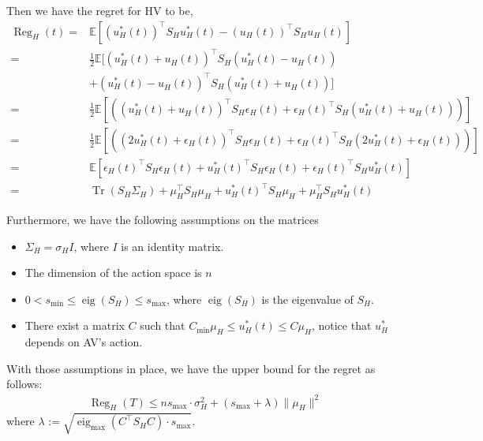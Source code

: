 Then we have the regret for HV to be,
\begin{align*}
      \operatorname{Reg}_H(t)  =& \mathbb{E} \left[(u_H^{*}(t))^{\top}S_H u_H^{*}(t) - (u_H(t)^{})^{\top}S_H u_H(t)^{} \right]\\
      =& \frac{1}{2}\mathbb{E} \Biggl[\left( u_H^{*}(t)+u_H^{}(t) \right)^{\top} S_H \left( u_H^{*}(t)-u_H^{}(t) \right)\\
      &+ \left( u_H^{*}(t)-u_H^{}(t) \right)^{\top}S_H\left( u_H^{*}(t)+u_H^{}(t) \right)  \Biggr] \\
      =& \frac{1}{2} \mathbb{E} \left[\left( \left( u_H^{*}(t)+u_H^{}(t) \right)^{\top}S_H \epsilon_H(t) + \epsilon_H(t)^{\top}S_H \left( u_H^{*}(t)+u_H^{}(t) \right)   \right)\right]\\
      =& \frac{1}{2}\mathbb{E} \left[\left( \left( 2u_H^{*}(t)+\epsilon_H(t) \right)^{\top}S_H \epsilon_H(t) + \epsilon_H(t)^{\top}S_H \left( 2u_H^{*}(t)+\epsilon_H(t) \right)   \right)\right]\\
      =& \mathbb{E} \left[\epsilon_H(t)^{\top}S_H \epsilon_H(t) + u_H^{*}(t)^{\top}S_H \epsilon_H(t) + \epsilon_H(t)^{\top} S_Hu_H^{*}(t) \right]\\
      =& \operatorname{Tr}(S_H\Sigma_H) + \mu_H^{\top}S_H\mu_H + u_H^{*}(t)^{\top}S_H \mu_H + \mu_H^{\top} S_Hu_H^{*}(t)
\end{align*}

Furthermore, we have the following assumptions on the matrices
\begin{itemize}
    \item $\Sigma_H = \sigma_H I $, where $I$ is an identity matrix.
    \item The dimension of the action space is $n$
    \item $0<s_{\min} \leq \operatorname{eig}(S_H) \leq s_{\max}$, where $\operatorname{eig}(S_H)$ is the eigenvalue of $S_H$.
    \item There exist a matrix $C$ such that $C_{\min}\mu_H\leq u_H^{*}(t) \leq C\mu_H$, notice that $u_H^{*}$ depends on AV's action. 
\end{itemize}

With those assumptions in place, we have the upper bound for the regret as follows:
\begin{align*}
     \operatorname{Reg}_H(T) \leq ns_{\max} \cdot \sigma_H^2 + (s_{\max}+\lambda) \|\mu_H\|^2
\end{align*}
where $\lambda_{} := \sqrt{\operatorname{eig}_{\max}(C^{\top}S_HC) \cdot s_{\max}}$. 


